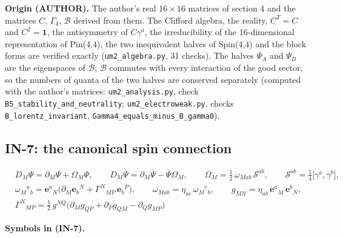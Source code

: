 \documentclass[
  10pt,
]{article}
\begin{document}
\textbf{Origin (AUTHOR).} The author's real \(16\times16\) matrices of
section 4 and the matrices \(C\), \(\Gamma_4\), \(\mathcal{B}\) derived
from them. The Clifford algebra, the reality, \(C^T = C\) and
\(C^2 = \mathbf{1}\), the antisymmetry of \(C\gamma^a\), the
irreducibility of the 16-dimensional representation of Pin(4,4), the two
inequivalent halves of Spin(4,4) and the block forms are verified
exactly (\texttt{um2\_algebra.py}, 31 checks). The halves \(\Psi_A\) and
\(\Psi_B\) are the eigenspaces of \(\mathcal{B}\); \(\mathcal{B}\)
commutes with every interaction of the good sector, so the numbers of
quanta of the two halves are conserved separately (computed with the
author's matrices: \texttt{um2\_analysis.py}, check
\texttt{B5\_stability\_and\_neutrality}; \texttt{um2\_electroweak.py},
checks \texttt{B\_lorentz\_invariant},
\texttt{Gamma4\_equals\_minus\_B\_gamma0}).

\hypertarget{in-7-the-canonical-spin-connection}{%
\subsection{IN-7: the canonical spin
connection}\label{in-7-the-canonical-spin-connection}}

\[
\begin{aligned}
&D_M\Psi = \partial_M\Psi + \Omega_M\Psi,\qquad D_M\bar\Psi = \partial_M\bar\Psi - \bar\Psi\Omega_M,\qquad
 \Omega_M = \tfrac12\,\omega_{Mab}\,\mathcal{S}^{ab},\qquad \mathcal{S}^{ab} = \tfrac14\big[\gamma^a,
 \gamma^b\big],\\
&\omega_M{}^a{}_b = \mathbf{e}^a{}_N\big(\partial_M\mathbf{e}_b{}^N +
 \Gamma^N{}_{MP}\,\mathbf{e}_b{}^P\big),\qquad
 \omega_{Mab} = \eta_{ac}\,\omega_M{}^c{}_b,\qquad g_{MN} = \eta_{ab}\,\mathbf{e}^a{}_M\,\mathbf{e}^b{}_N,\\
&\Gamma^N{}_{MP} = \tfrac12\,g^{NQ}\big(\partial_Mg_{QP} + \partial_Pg_{QM} - \partial_Qg_{MP}\big)
\end{aligned} \tag{IN-7}
\]

\textbf{Symbols in (IN-7).}
\end{document}
